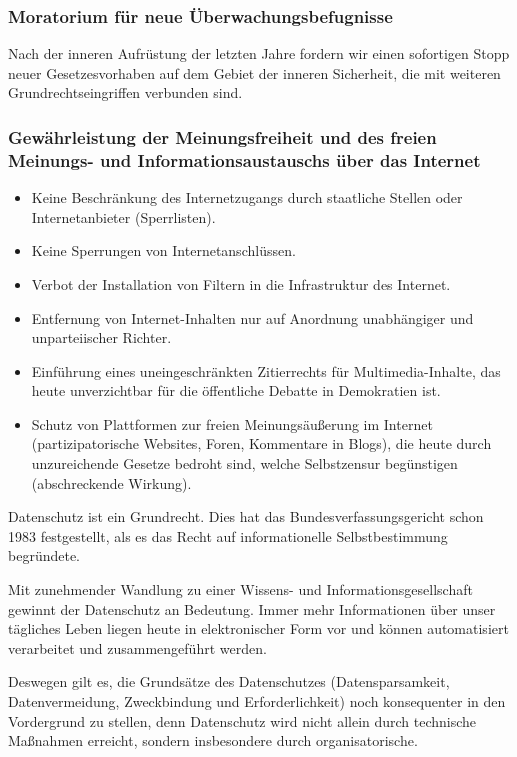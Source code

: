 \subsubsection{Moratorium für neue Überwachungsbefugnisse}
\abstimmung
Nach der inneren Aufrüstung der letzten Jahre fordern wir einen sofortigen Stopp neuer Gesetzesvorhaben auf dem Gebiet der inneren Sicherheit, die mit weiteren Grundrechtseingriffen verbunden sind.

\subsubsection{Gewährleistung der Meinungsfreiheit und des freien Meinungs- und Informationsaustauschs über das Internet}
\abstimmung
\begin{itemize}
\item Keine Beschränkung des Internetzugangs durch staatliche Stellen oder Internetanbieter (Sperrlisten).
\item Keine Sperrungen von Internetanschlüssen.
\item Verbot der Installation von Filtern in die Infrastruktur des Internet.
\item Entfernung von Internet-Inhalten nur auf Anordnung unabhängiger und unparteiischer Richter.
\item Einführung eines uneingeschränkten Zitierrechts für Multimedia-Inhalte, das heute unverzichtbar für die öffentliche Debatte in Demokratien ist.
\item Schutz von Plattformen zur freien Meinungsäußerung im Internet (partizipatorische Websites, Foren, Kommentare in Blogs), die heute durch unzureichende Gesetze bedroht sind, welche Selbstzensur begünstigen (abschreckende Wirkung).
\end{itemize}

\label{datenschutz:datenschutz}
 Datenschutz ist ein Grundrecht. Dies hat das Bundesverfassungsgericht schon 1983 festgestellt, als es das Recht auf informationelle Selbstbestimmung begründete.

Mit zunehmender Wandlung zu einer Wissens- und Informationsgesellschaft gewinnt der Datenschutz an Bedeutung. Immer mehr Informationen über unser tägliches Leben liegen heute in elektronischer Form vor und können automatisiert verarbeitet und zusammengeführt werden.

Deswegen gilt es, die Grundsätze des Datenschutzes (Datensparsamkeit, Datenvermeidung, Zweckbindung und Erforderlichkeit) noch konsequenter in den Vordergrund zu stellen, denn Datenschutz wird nicht allein durch technische Maßnahmen erreicht, sondern insbesondere durch organisatorische.

